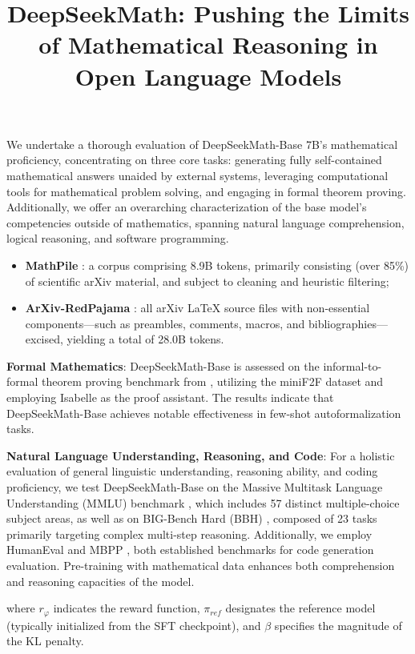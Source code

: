 \title{DeepSeekMath: Pushing the Limits of Mathematical Reasoning in Open Language Models}
We undertake a thorough evaluation of DeepSeekMath-Base 7B’s mathematical proficiency, concentrating on three core tasks: generating fully self-contained mathematical answers unaided by external systems, leveraging computational tools for mathematical problem solving, and engaging in formal theorem proving. Additionally, we offer an overarching characterization of the base model's competencies outside of mathematics, spanning natural language comprehension, logical reasoning, and software programming.

\begin{itemize}[topsep=0pt]
    \item \textbf{MathPile} \citep{mathpile}: a corpus comprising 8.9B tokens, primarily consisting (over 85\%) of scientific arXiv material, and subject to cleaning and heuristic filtering;
    \item \textbf{ArXiv-RedPajama} \citep{redpajama}: all arXiv LaTeX source files with non-essential components—such as preambles, comments, macros, and bibliographies—excised, yielding a total of 28.0B tokens.
\end{itemize}



\item \textbf{Formal Mathematics}: DeepSeekMath-Base is assessed on the informal-to-formal theorem proving benchmark from \citep{dsp_proof}, utilizing the miniF2F dataset \citep{minif2f} and employing Isabelle \citep{isabelle} as the proof assistant. The results indicate that DeepSeekMath-Base achieves notable effectiveness in few-shot autoformalization tasks.
\item \textbf{Natural Language Understanding, Reasoning, and Code}: For a holistic evaluation of general linguistic understanding, reasoning ability, and coding proficiency, we test DeepSeekMath-Base on the Massive Multitask Language Understanding (MMLU) benchmark \citep{mmlu}, which includes 57 distinct multiple-choice subject areas, as well as on BIG-Bench Hard (BBH) \citep{bbh}, composed of 23 tasks primarily targeting complex multi-step reasoning. Additionally, we employ HumanEval \citep{codex} and MBPP \citep{mbpp}, both established benchmarks for code generation evaluation. Pre-training with mathematical data enhances both comprehension and reasoning capacities of the model.

where $r_\varphi$ indicates the reward function, $\pi_{ref}$ designates the reference model (typically initialized from the SFT checkpoint), and $\beta$ specifies the magnitude of the KL penalty.

